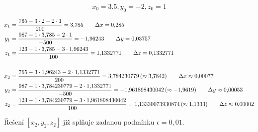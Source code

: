 \documentclass[12pt,a4paper]{article}
\begin{document}
$$ x_0 = 3.5, y_0 = -2, z_0 = 1 $$

\begin{align*}
x_{1} &= \frac{765-3\cdot2-2\cdot1}{200} = 3{,}785 \tag*{$\Delta x = 0{,}285$}\\
y_{1} &= \frac{987-1\cdot3{,}785-2\cdot1}{-500} = -1{,}96243 \tag*{$\Delta y = 0{,}03757$}\\
z_{1} &= \frac{123-1\cdot3{,}785-3\cdot1{,}96243}{100} = 1{,}1332771 \tag*{$\Delta z = 0{,}1332771$}\\
\\
x_{2} &= \frac{765-3\cdot1{,}96243-2\cdot1{,}1332771}{200} = 3{,}784230779\,(\approx 3{,}7842) \tag*{$\Delta x \approx 0{,}00077$}\\
y_{2} &= \frac{987-1\cdot3{,}784230779-2\cdot1{,}1332771}{-500} = -1{,}961898430042\,(\approx -1{,}9619) \tag*{$\Delta y \approx 0{,}00053$}\\
z_{2} &= \frac{123-1\cdot3{,}784230779-3\cdot1{,}961898430042}{100} = 1{,}13330073930874\,(\approx 1{,}1333) \tag*{$\Delta z \approx 0{,}00002$}\\
\end{align*}

Řešení $[x_2, y_2, z_2]$ již splňuje zadanou podmínku $\epsilon = 0,01$.

\newpage

\end{document}
